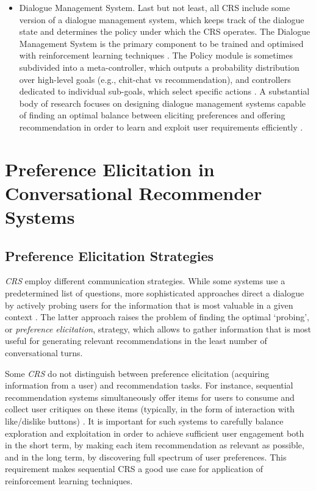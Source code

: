\begin{itemize}
    \item Dialogue Management System. Last but not least, all CRS include some version of a dialogue management system, which keeps track of the dialogue state and determines the policy under which the CRS operates. The Dialogue Management System is the primary component to be trained and optimised with reinforcement learning techniques \citep{tsumita2019dialogue}. The Policy module is sometimes subdivided into a meta-controller, which outputs a probability distribution over high-level goals (e.g., chit-chat vs recommendation), and controllers dedicated to individual sub-goals, which select specific actions \citep{greco2017converse}. A substantial body of research focuses on designing dialogue management systems capable of finding an optimal balance between eliciting preferences and offering recommendation in order to learn and exploit user requirements efficiently \citep{sun2018conversational, li2021seamlessly}.
\end{itemize}

\section{Preference Elicitation in Conversational Recommender Systems}
\subsection{Preference Elicitation Strategies}

\textit{CRS} employ different communication strategies. While some systems use a predetermined list of questions, more sophisticated approaches direct a dialogue by actively probing users for the information that is most valuable in a given context \citep{sun2018conversational, christakopoulou2016towards}. The latter approach raises the problem of finding the optimal ‘probing’, or \textit{preference elicitation}, strategy, which allows to gather information that is most useful for generating relevant recommendations in the least number of conversational turns. 

Some \textit{CRS} do not distinguish between preference elicitation (acquiring information from a user) and recommendation tasks. For instance, sequential recommendation systems simultaneously offer items for users to consume and collect user critiques on these items (typically, in the form of interaction with like/dislike buttons) \citep{zhao2013interactive}. It is important for such systems to carefully balance exploration and exploitation in order to achieve sufficient user engagement both in the short term, by making each item recommendation as relevant as possible, and in the long term, by discovering full spectrum of user preferences. This requirement makes sequential CRS a good use case for application of reinforcement learning techniques.

